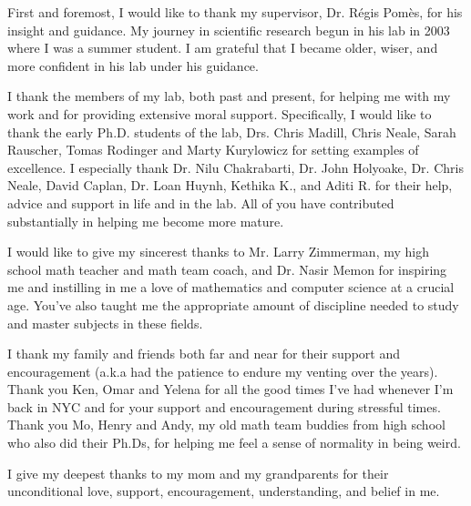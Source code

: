 First and foremost, I would like to thank my supervisor, Dr. R\'{e}gis Pom\`{e}s, for his insight and guidance. My journey in scientific research begun in his lab in 2003 where I was a summer student.  I am grateful that I became older, wiser, and more confident in his lab under his guidance.

I thank the members of my lab, both past and present, for helping me with my work and for providing extensive moral support. Specifically, I would like to thank the early Ph.D. students of the lab, Drs. Chris Madill, Chris Neale, Sarah Rauscher, Tomas Rodinger and Marty Kurylowicz for setting examples of excellence. I especially thank Dr. Nilu Chakrabarti, Dr. John Holyoake, Dr. Chris Neale, David Caplan, Dr. Loan Huynh, Kethika K., and Aditi R. for their help, advice and support in life and in the lab. All of you have contributed substantially in helping me become more mature.

I would like to give my sincerest thanks to Mr. Larry Zimmerman, my high school math teacher and math team coach, and Dr. Nasir Memon for inspiring me and instilling in me a love of mathematics and computer science at a crucial age. You've also taught me the appropriate amount of discipline needed to study and master subjects in these fields.

I thank my family and friends both far and near for their support and encouragement (a.k.a had the patience to endure my venting over the years).  Thank you Ken, Omar and Yelena for all the good times I've had whenever I'm back in NYC and for your support and encouragement during stressful times. Thank you Mo, Henry and Andy, my old math team buddies from high school who also did their Ph.Ds, for helping me feel a sense of normality in being weird.

I give my deepest thanks to my mom and my grandparents for their unconditional love, support, encouragement, understanding, and belief in me.
